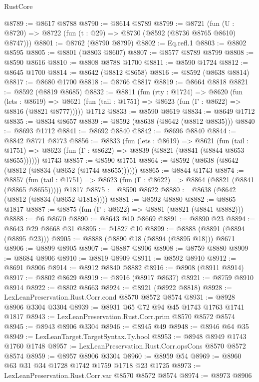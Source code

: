 \begin{lexlean}{RustCore}
\begin{coremodule}
@8789 := @8617 @8788
@8790 := @8614 @8789
@8799 := @8721 (fun (U : @8720) => @8722 (fun (t : @29) => @8730 (@8592 (@8736 @8765 @8610) @8747)))
@8801 := @8762 (@8790 @8799)
@8802 := Eq.refl.{1}
@8803 := @8802 @8595
@8805 := @8801 (@8803 @8607)
@8807 := @8577 @8789 @8799
@8808 := @8590 @8616
@8810 := @8808 @8788 @1700
@8811 := @8590 @1724
@8812 := @8645 @1700
@8814 := @8642 (@8812 @8658)
@8816 := @8592 (@8638 @8814)
@8817 := @8680 @1700
@8818 := @8766 @8817
@8819 := @8664 @8818
@8821 := @8592 (@8819 @8685)
@8832 := @8811
    (fun (rty : @1724) =>
    @8620
      (fun (lets : @8619) =>
      @8621 (fun (tail : @1751) => @8623 (fun (Γ : @8622) => @8816 (@8821 @8777)))))
    @1712
@8833 := @8590 @8619
@8834 := @8649 @1712
@8835 := @8834 @8657
@8839 := @8592 (@8638 (@8642 (@8812 @8835)))
@8840 := @8693 @1712
@8841 := @8692 @8840
@8842 := @8696 @8840
@8844 := @8842 @8771 @8773
@8856 := @8833
    (fun (lets : @8619) =>
    @8621
      (fun (tail : @1751) => @8623 (fun (Γ : @8622) => @8839 (@8821 (@8841 (@8844 @8653 @8655))))))
    @1743
@8857 := @8590 @1751
@8864 := @8592 (@8638 (@8642 (@8812 (@8834 (@8652 (@1744 @8655))))))
@8865 := @8844 @1743
@8874 := @8857
    (fun (tail : @1751) => @8623 (fun (Γ : @8622) => @8864 (@8821 (@8841 (@8865 @8655)))))
    @1817
@8875 := @8590 @8622
@8880 := @8638 (@8642 (@8812 (@8834 (@8652 @1818))))
@8881 := @8592 @8880
@8882 := @8865 @1817
@8887 := @8875 (fun (Γ : @8622) => @8881 (@8821 (@8841 @8882)))
@8888 := @6 @8670
@8890 := @8643 @10 @8669
@8891 := @8890 @23
@8894 := @8643 @29 @8668 @31
@8895 := @1827 @10
@8899 := @8888 (@8891 (@8894 (@8895 @23)))
@8905 := @8888 (@8890 @18 (@8894 (@8895 @18))) @8671
@8906 := @8899 @8905
@8907 := @8887 @8906
@8908 := @8759 @8880
@8909 := @8684 @8906
@8910 := @8819 @8909
@8911 := @8592 @8910
@8912 := @8691 @8906
@8914 := @8912 @8840 @8882
@8916 := @8908 (@8911 @8914)
@8917 := @8802 @8629
@8919 := @8916 (@8917 @8637)
@8921 := @8759 @8910 @8914
@8922 := @8802 @8663
@8924 := @8921 (@8922 @8818)
@8928 := LexLeanPreservation.Rust.Corr.cond @8570 @8572 @8574
@8931 := @8928 @8906 @3304 @3304
@8939 := @8931 @65 @72 @94 @45 @1743 @1763 @1741 @1817
@8943 := LexLeanPreservation.Rust.Corr.prim @8570 @8572 @8574
@8945 := @8943 @8906 @3304
@8946 := @8945 @49
@8948 := @8946 @64 @35
@8949 := LexLeanTarget.TargetSyntax.Ty.bool
@8953 := @8948 @8949 @1743 @1760 @1748
@8957 := LexLeanPreservation.Rust.Corr.opsCons @8570 @8572 @8574
@8959 := @8957 @8906 @3304
@8960 := @8959 @54
@8969 := @8960 @63 @31 @34 @1728 @1742 @1759 @1718 @23 @1725
@8973 := LexLeanPreservation.Rust.Corr.var @8570 @8572 @8574
@8974 := @8973 @8906

\end{coremodule}
\end{lexlean}
